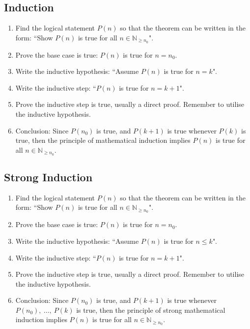 \documentclass{article}
\newcommand*{\N}{\mathbb{N}}
\theoremstyle{plain}
\numberwithin{theorem}{subsection}
\theoremstyle{definition}
\numberwithin{definition}{subsection}
\theoremstyle{remark}
\numberwithin{note}{subsection}
\begin{document}
\subsection{Induction}
\begin{enumerate}
    \item Find the logical statement $P(n)$ so that the theorem can be written in the form: ``Show $P(n)$ is true for all $n \in \N_{\geqslant n_0}$".
    \item Prove the base case is true: $P(n)$ is true for $n=n_0$.
    \item Write the inductive hypothesis: ``Assume $P(n)$ is true for $n=k$".
    \item Write the inductive step: ``$P(n)$ is true for $n=k+1$".
    \item Prove the inductive step is true, usually a direct proof. Remember to utilise the inductive hypothesis.
    \item Conclusion: Since $P(n_0)$ is true, and $P(k+1)$ is true whenever $P(k)$ is true, then the principle of mathematical induction implies $P(n)$ is true for all $n\in \N_{\geqslant n_0}$.
\end{enumerate}
%
\subsection{Strong Induction}
\begin{enumerate}
    \item Find the logical statement $P(n)$ so that the theorem can be written in the form: ``Show $P(n)$ is true for all $n \in \N_{\geqslant n_0}$".
    \item Prove the base case is true: $P(n)$ is true for $n=n_0$.
    \item Write the inductive hypothesis: ``Assume $P(n)$ is true for $n\leqslant k$".
    \item Write the inductive step: ``$P(n)$ is true for $n=k+1$".
    \item Prove the inductive step is true, usually a direct proof. Remember to utilise the inductive hypothesis.
    \item Conclusion: Since $P(n_0)$ is true, and $P(k+1)$ is true whenever $P(n_0),\: \ldots,\: P(k)$ is true, then the principle of strong mathematical induction implies $P(n)$ is true for all $n\in \N_{\geqslant n_0}$.
\end{enumerate}
%
\pagebreak
\end{document}
